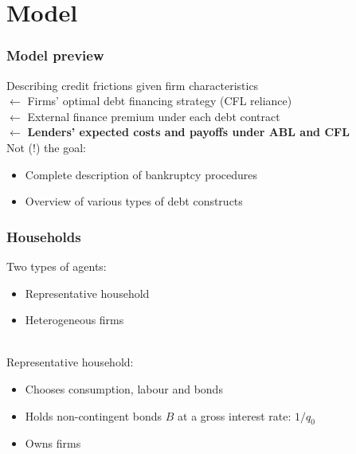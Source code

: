 \documentclass[notes]{beamer}
\begin{document}
\section{Model}

\begin{frame}
\frametitle{Model preview}

Describing credit frictions given firm characteristics \vspace{1mm }\\
\hspace{2mm} $\leftarrow$  Firms' optimal debt financing strategy (CFL reliance) \vspace{1mm }\\
\hspace{2mm} $\leftarrow$  External finance premium under each debt contract \vspace{1mm }\\
\hspace{2mm} $\leftarrow$  \textbf{Lenders' expected costs and payoffs under ABL and CFL} \vspace{5mm }\\

Not (!) the goal: 
\begin{itemize} \setlength\itemsep{0em}
    \item Complete description of bankruptcy procedures
    \item Overview of various types of debt constructs
\end{itemize}

\end{frame}


\begin{frame}[label = HH]
\frametitle{Households}
Two types of agents: 
\begin{itemize} \setlength\itemsep{0em}
    \item Representative household
    \item Heterogeneous firms 
\end{itemize} \vspace{3mm} \\
Representative household:
\begin{itemize}\setlength\itemsep{0em}
\item Chooses consumption, labour and bonds
\item Holds non-contingent bonds $B$ at a gross interest rate: $1/q_0$
\item Owns firms
\end{itemize} 
\vfill %
\begin{center}
\hyperlink{HH problem}{}
\end{center}
 
\end{frame}
\end{document}
